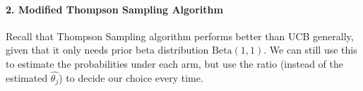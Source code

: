 \documentclass[11pt]{article}
\begin{document}
\hypertarget{thompson-sampling-algorithm}{%
\paragraph{2. Modified Thompson Sampling
Algorithm}\label{thompson-sampling-algorithm}}

Recall that Thompson Sampling algorithm performs better than UCB
generally, given that it only needs prior beta distribution
\(\mathrm{Beta}(1,1)\). We can still use this to estimate the
probabilities under each arm, but use the ratio (instead of the
estimated \(\hat{\theta_j}\)) to decide our choice every time.



    


    
    
    
\end{document}
